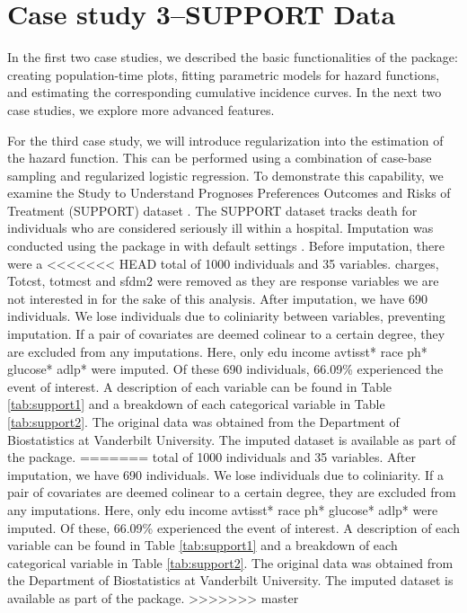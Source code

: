 \documentclass[
]{jss}
\begin{document}
\hypertarget{case-study-3support-data}{%
\section{Case study 3--SUPPORT Data}\label{case-study-3support-data}}

In the first two case studies, we described the basic functionalities of
the  package: creating population-time plots, fitting
parametric models for hazard functions, and estimating the corresponding
cumulative incidence curves. In the next two case studies, we explore
more advanced features.

For the third case study, we will introduce regularization into the
estimation of the hazard function. This can be performed using a
combination of case-base sampling and regularized logistic regression.
To demonstrate this capability, we examine the Study to Understand
Prognoses Preferences Outcomes and Risks of Treatment (SUPPORT) dataset
\citep{knaus1995support}. The SUPPORT dataset tracks death for
individuals who are considered seriously ill within a hospital.
Imputation was conducted using the  package in 
with default settings \citep{mice}. Before imputation, there were a
<<<<<<< HEAD
total of 1000 individuals and 35 variables. charges, Totcst, totmcst and
sfdm2 were removed as they are response variables we are not interested
in for the sake of this analysis. After imputation, we have 690
individuals. We lose individuals due to coliniarity between variables,
preventing imputation. If a pair of covariates are deemed colinear to a
certain degree, they are excluded from any imputations. Here, only edu
income avtisst* race ph* glucose* adlp* were imputed. Of these 690
individuals, 66.09\% experienced the event of interest. A description of
each variable can be found in Table \ref{tab:support1} and a breakdown
of each categorical variable in Table \ref{tab:support2}. The original
data was obtained from the Department of Biostatistics at Vanderbilt
University. The imputed dataset is available as part of the
 package.
=======
total of 1000 individuals and 35 variables. After imputation, we have
690 individuals. We lose individuals due to coliniarity. If a pair of
covariates are deemed colinear to a certain degree, they are excluded
from any imputations. Here, only edu income avtisst* race ph* glucose*
adlp* were imputed. Of these, 66.09\% experienced the event of interest.
A description of each variable can be found in Table \ref{tab:support1}
and a breakdown of each categorical variable in Table
\ref{tab:support2}. The original data was obtained from the Department
of Biostatistics at Vanderbilt University. The imputed dataset is
available as part of the  package.
>>>>>>> master
\end{document}
